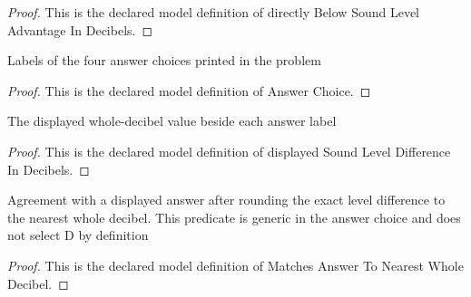 \begin{proof}
  This is the declared model definition of directly Below Sound Level Advantage In Decibels.
\end{proof}
\begin{definition}
  \label{def:physics:phyx-mini-0216:phyxminiproblems-problemphyxmini0216-answerchoice}
  Labels of the four answer choices printed in the problem
\end{definition}
\begin{proof}
  This is the declared model definition of Answer Choice.
\end{proof}
\begin{definition}
  \label{def:physics:phyx-mini-0216:phyxminiproblems-problemphyxmini0216-displayedsoundleveldifferenceindecibels}
  The displayed whole-decibel value beside each answer label
\end{definition}
\begin{proof}
  This is the declared model definition of displayed Sound Level Difference In Decibels.
\end{proof}
\begin{definition}
  \label{def:physics:phyx-mini-0216:phyxminiproblems-problemphyxmini0216-matchesanswertonearestwholedecibel}
  Agreement with a displayed answer after rounding the exact level difference to the nearest whole decibel. This predicate is generic in the answer choice and does not select D by definition
\end{definition}
\begin{proof}
  This is the declared model definition of Matches Answer To Nearest Whole Decibel.
\end{proof}
